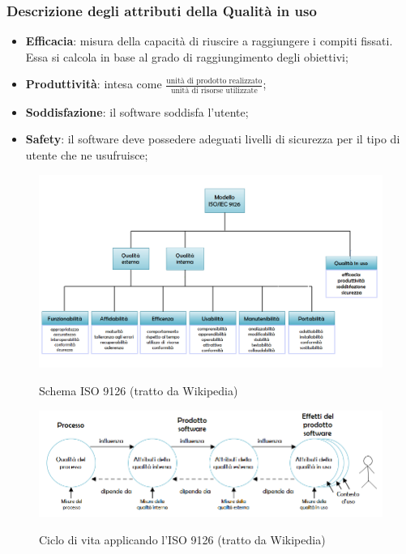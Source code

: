		\subsubsection{Descrizione degli attributi della Qualità in uso}
		\begin{itemize}
			\item \textbf{Efficacia}: misura della capacità di riuscire a raggiungere i compiti fissati. Essa si calcola
			in base al grado di raggiungimento degli obiettivi;
			\item \textbf{Produttività}: intesa come $ \frac{\text{unità di prodotto realizzato}}{\text{unità di risorse utilizzate}} $;
			\item \textbf{Soddisfazione}: il software soddisfa l'utente;
			\item \textbf{Safety}: il software deve possedere adeguati livelli di sicurezza per il tipo di utente che ne usufruisce;
		\end{itemize}
	
	\begin{figure}[H]
		\includegraphics[width=\textwidth]{img/ISO9126.png}
		\label{fig:iso9126}
		\caption[Schema ISO 9126]{Schema ISO 9126 (tratto da Wikipedia)}
	\end{figure}

	
	
	\begin{figure}[H]
		\includegraphics[width=\textwidth]{img/Ciclo_di_vita_9126.png}
		\label{fig:ciclo_di_vita}
		\caption[Ciclo di vita con l'ISO 0126]{Ciclo di vita applicando l'ISO 9126 (tratto da Wikipedia)}
	\end{figure}


